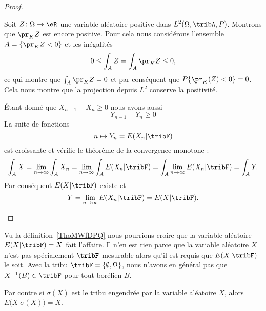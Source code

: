 \begin{proof}
\begin{subproof}
            Soit \( Z\colon \Omega\to \eR\) une variable aléatoire positive dans \( L^2(\Omega,\tribA,P)\). Montrons que \( \pr_KZ\) est encore positive. Pour cela nous considérons l'ensemble \( A=\{ \pr_KZ<0 \}\) et les inégalités
            \begin{equation}
                0\leq \int_AZ=\int_A\pr_KZ\leq 0,
            \end{equation}
            ce qui montre que \( \int_A\pr_KZ=0\) et par conséquent que \( P\{ \pr_K(Z)<0 \}=0\). Cela nous montre que la projection depuis \( L^2\) conserve la positivité.

            Étant donné que \( X_{n-1}-X_n\geq 0\) nous avons aussi
            \begin{equation}
                Y_{n-1}-Y_{n}\geq 0
            \end{equation}
            La suite de fonctions
            \begin{equation}
                n\mapsto Y_n=E(X_n|\tribF)
            \end{equation}
            est croissante et vérifie le théorème de la convergence monotone :
            \begin{equation}
                    \int_A X=\lim_{n\to \infty} \int_A X_n =\lim_{n\to \infty} \int_A E(X_n|\tribF)=\int_A\lim_{n\to \infty } E(X_n|\tribF)=\int_A Y.
            \end{equation}
            Par conséquent \( E(X|\tribF)\) existe et
            \begin{equation}
                Y=\lim_{n\to \infty} E(X_n|\tribF)=E(X|\tribF).
            \end{equation}
    \end{subproof}
\end{proof}

\begin{normaltext}      \label{NORMooHPHOooUuJWHR}
    Vu la définition~\ref{ThoMWfDPQ} nous pourrions croire que la variable aléatoire \( E(X|\tribF)=X\) fait l'affaire. Il n'en est rien parce que la variable aléatoire \( X\) n'est pas spécialement \( \tribF\)-mesurable alors qu'il est requis que \( E(X|\tribF)\) le soit. Avec la tribu \( \tribF=\{ \emptyset,\Omega \}\), nous n'avons en général pas que \( X^{-1}(B)\in \tribF\) pour tout borélien \( B\).

    Par contre si \( \sigma(X)\) est le tribu engendrée par la variable aléatoire \( X\), alors \( E\big( X |\sigma(X) \big)=X\).
\end{normaltext}

